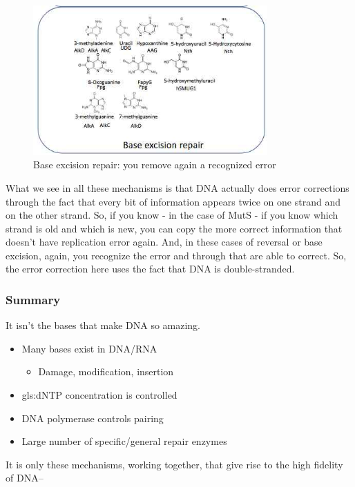 \documentclass[]{article}
\begin{document}
\begin{figure}[H]
	\begin{center}
		\caption{Base excision repair: you remove again a recognized error}\label{fig:MMR2}
		\includegraphics[width=0.8\textwidth]{MMR2}
	\end{center}
\end{figure}

What we see in all these mechanisms is that DNA actually does error corrections through the fact that every bit of information appears twice on one strand and on the other strand.
So, if you know - in the case of MutS - if you know which strand is old and which is new, you can copy the more correct information that doesn't have replication error again.
And, in these cases of reversal or base excision, again, you recognize the error and through that are able to correct.
So, the error correction here uses the fact that DNA is double-stranded.

\subsubsection{Summary}
 It isn’t the bases that make DNA so amazing.
\begin{itemize}
	\item Many bases exist in DNA/RNA
	\begin{itemize}
		\item Damage, modification, insertion
	\end{itemize}
	\item \gls{gls:dNTP} concentration is controlled
	\item DNA polymerase controls	pairing
	\item Large number of specific/general repair enzymes
\end{itemize}

It is only these mechanisms, working together, that give rise to the high fidelity of DNA--\cite{kunkel2004dna}
\end{document}
